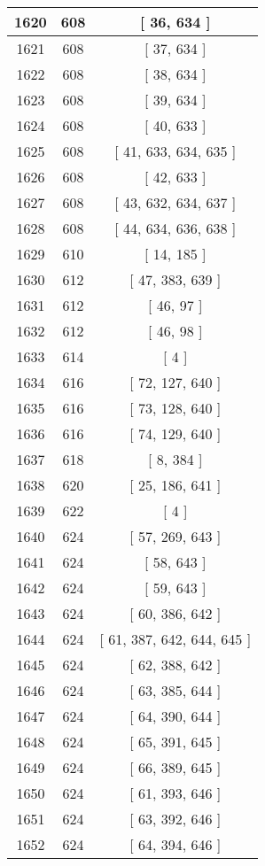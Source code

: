 \begin{center}
\begin{longtable}[H]{|| c c c ||}
\hline
1620 & 608 & [ 36, 634 ] \\ 
\hline
1621 & 608 & [ 37, 634 ] \\ 
\hline
1622 & 608 & [ 38, 634 ] \\ 
\hline
1623 & 608 & [ 39, 634 ] \\ 
\hline
1624 & 608 & [ 40, 633 ] \\ 
\hline
1625 & 608 & [ 41, 633, 634, 635 ] \\ 
\hline
1626 & 608 & [ 42, 633 ] \\ 
\hline
1627 & 608 & [ 43, 632, 634, 637 ] \\ 
\hline
1628 & 608 & [ 44, 634, 636, 638 ] \\ 
\hline
1629 & 610 & [ 14, 185 ] \\ 
\hline
1630 & 612 & [ 47, 383, 639 ] \\ 
\hline
1631 & 612 & [ 46, 97 ] \\ 
\hline
1632 & 612 & [ 46, 98 ] \\ 
\hline
1633 & 614 & [ 4 ] \\ 
\hline
1634 & 616 & [ 72, 127, 640 ] \\ 
\hline
1635 & 616 & [ 73, 128, 640 ] \\ 
\hline
1636 & 616 & [ 74, 129, 640 ] \\ 
\hline
1637 & 618 & [ 8, 384 ] \\ 
\hline
1638 & 620 & [ 25, 186, 641 ] \\ 
\hline
1639 & 622 & [ 4 ] \\ 
\hline
1640 & 624 & [ 57, 269, 643 ] \\ 
\hline
1641 & 624 & [ 58, 643 ] \\ 
\hline
1642 & 624 & [ 59, 643 ] \\ 
\hline
1643 & 624 & [ 60, 386, 642 ] \\ 
\hline
1644 & 624 & [ 61, 387, 642, 644, 645 ] \\ 
\hline
1645 & 624 & [ 62, 388, 642 ] \\ 
\hline
1646 & 624 & [ 63, 385, 644 ] \\ 
\hline
1647 & 624 & [ 64, 390, 644 ] \\ 
\hline
1648 & 624 & [ 65, 391, 645 ] \\ 
\hline
1649 & 624 & [ 66, 389, 645 ] \\ 
\hline
1650 & 624 & [ 61, 393, 646 ] \\ 
\hline
1651 & 624 & [ 63, 392, 646 ] \\ 
\hline
1652 & 624 & [ 64, 394, 646 ] \\ 

\end{longtable}
\end{center}
